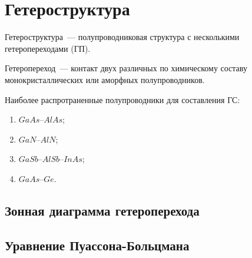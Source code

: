 \section{Гетероструктура}
Гетероструктура~--- полупроводниковая структура с несколькими гетеропереходами (ГП). 


Гетеропереход~--- контакт двух различных по химическому составу монокристаллических или аморфных полупроводников.

Наиболее распротраненные полупроводники для составления ГС:
\begin{enumerate}
  \item $GaAs$--$AlAs$;
  \item $GaN$--$AlN$;
  \item $GaSb$--$AlSb$--$InAs$;
  \item $GaAs$--$Ge$.
\end{enumerate}

\subsection{Зонная диаграмма гетероперехода}
\subsection{Уравнение Пуассона-Больцмана}






